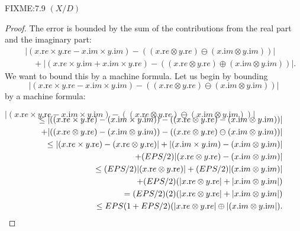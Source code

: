 \begin{definition}
\begin{proposition}{FIXME:7.9 $(X / D)$}
\begin{proof}{}
The error is bounded by the sum of the contributions from the real part and the imaginary part:
\begin{eqnarray*}
&&|(x.{\mathrm re} \times  y.{\mathrm re} - x.{\mathrm im} \times y.{\mathrm im}) - ((x.{\mathrm re} \otimes y.{\mathrm re}) \ominus
(x.{\mathrm im}
\otimes y.{\mathrm im}))| \\[6pt]
&&\quad + |(x.{\mathrm re} \times  y.{\mathrm im} + x.{\mathrm im} \times y.{\mathrm re}) - ((x.{\mathrm re} \otimes y.{\mathrm re}) \oplus (x.{\mathrm im}
\otimes y.{\mathrm im}))|.
\end{eqnarray*}
   We want to bound this by a machine formula.  Let us begin by bounding 
$$|(x.{\mathrm re} \times  y.{\mathrm re} - x.{\mathrm im} \times y.{\mathrm im}) - ((x.{\mathrm re} \otimes y.{\mathrm re}) \ominus (x.{\mathrm im}
 \otimes y.{\mathrm im}))| $$ 
by a machine formula:\eject

\centerline{
${\displaystyle |(x.{\mathrm re} \times  y.{\mathrm re} - x.{\mathrm im} \times y.{\mathrm im}) - ((x.{\mathrm re} \otimes y.{\mathrm re}) \ominus
(x.{\mathrm im}
\otimes y.{\mathrm im}))| }$}
\begin{eqnarray*}
\noalign{\vskip-16pt}
&&\le |((x.{\mathrm re} \times  y.{\mathrm re}) - (x.{\mathrm im} \times y.{\mathrm im})) - ((x.{\mathrm re} \otimes y.{\mathrm re}) -
(x.{\mathrm im}
\otimes y.{\mathrm im}))|\\
&&\quad + |((x.{\mathrm re} \otimes y.{\mathrm re}) - (x.{\mathrm im} \otimes y.{\mathrm im}))-((x.{\mathrm re} \otimes y.{\mathrm re})
\ominus (x.{\mathrm im} \otimes y.{\mathrm im}))| \\
&&\le |(x.{\mathrm re} \times  y.{\mathrm re}) - (x.{\mathrm re} \otimes y.{\mathrm re})| + |(x.{\mathrm
im} \times y.{\mathrm im})- (x.{\mathrm im} \otimes y.{\mathrm im})| \\
&&\quad + (EPS/2)|(x.{\mathrm re} \otimes y.{\mathrm re}) - (x.{\mathrm im} \otimes
y.{\mathrm im})|\\
&&\le (EPS/2)|(x.{\mathrm re} \otimes y.{\mathrm re})| + (EPS/2)|(x.{\mathrm im} \otimes y.{\mathrm im})| \\
&&\quad + (EPS/2)(|x.{\mathrm re} \otimes
y.{\mathrm re}| + |x.{\mathrm im} \otimes y.{\mathrm im}|)\\
&&= (EPS/2)(2) (|x.{\mathrm re} \otimes y.{\mathrm re}| + |x.{\mathrm im} \otimes y.{\mathrm
im}|)\\
&&\le EPS (1 + EPS/2) (|x.{\mathrm re} \otimes y.{\mathrm re}| \oplus |(x.{\mathrm im} \otimes y.{\mathrm im}|) .
\end{eqnarray*}



\end{proof}
\end{proposition}
\end{definition}
